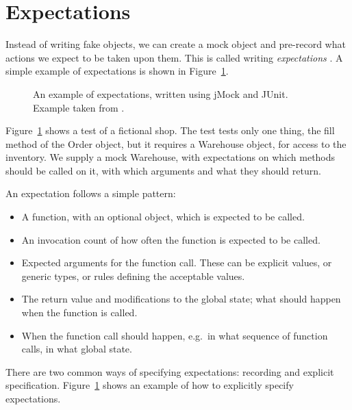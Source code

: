 \documentclass[a4paper,11pt]{kth-mag}
\begin{document}
\section{Expectations} \label{section-expectations}

Instead of writing fake objects, we can create a mock object and pre-record
what actions we expect to be taken upon them. This is called writing
\textit{expectations} \cite{fowler07expectations}. A simple example of
expectations is shown in Figure~\ref{figure-expectations}.

\begin{figure}[h!]
	\begin{center}
	\begin{minipage}{0.9\textwidth}
		\lstset{language=Java}
		
	\end{minipage}
	\end{center}

	\caption{An example of expectations, written using jMock and JUnit.
	Example taken from \cite{fowler07expectations}.}
	\label{figure-expectations}
\end{figure}

Figure~\ref{figure-expectations} shows a test of a fictional shop. The test
tests only one thing, the fill method of the Order object, but it requires a
Warehouse object, for access to the inventory. We supply a mock Warehouse, with
expectations on which methods should be called on it, with which arguments and
what they should return.

An expectation follows a simple pattern:

\begin{itemize}
	\item A function, with an optional object, which is expected to be called.
	\item An invocation count of how often the function is expected to be called.
	\item Expected arguments for the function call. These can be explicit values,
		or generic types, or rules defining the acceptable values.
	\item The return value and modifications to the global state; what should
		happen when the function is called.
	\item When the function call should happen, e.g.\ in what sequence of
		function calls, in what global state.
\end{itemize}

There are two common ways of specifying expectations: recording and explicit
specification. Figure~\ref{figure-expectations} shows an example of how to
explicitly specify expectations.
\end{document}

